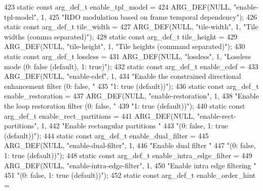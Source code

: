 \begin{DoxyCodeInclude}
{{{{{{{423 \textcolor{keyword}{static} \textcolor{keyword}{const} arg\_def\_t enable\_tpl\_model =
424     ARG\_DEF(NULL, \textcolor{stringliteral}{"enable-tpl-model"}, 1,
425             \textcolor{stringliteral}{"RDO modulation based on frame temporal dependency"});
426 \textcolor{keyword}{static} \textcolor{keyword}{const} arg\_def\_t tile\_width =
427     ARG\_DEF(NULL, \textcolor{stringliteral}{"tile-width"}, 1, \textcolor{stringliteral}{"Tile widths (comma separated)"});
428 \textcolor{keyword}{static} \textcolor{keyword}{const} arg\_def\_t tile\_height =
429     ARG\_DEF(NULL, \textcolor{stringliteral}{"tile-height"}, 1, \textcolor{stringliteral}{"Tile heights (command separated)"});
430 \textcolor{keyword}{static} \textcolor{keyword}{const} arg\_def\_t lossless =
431     ARG\_DEF(NULL, \textcolor{stringliteral}{"lossless"}, 1, \textcolor{stringliteral}{"Lossless mode (0: false (default), 1: true)"});
432 \textcolor{keyword}{static} \textcolor{keyword}{const} arg\_def\_t enable\_cdef =
433     ARG\_DEF(NULL, \textcolor{stringliteral}{"enable-cdef"}, 1,
434             \textcolor{stringliteral}{"Enable the constrained directional enhancement filter (0: false, "}
435             \textcolor{stringliteral}{"1: true (default))"});
436 \textcolor{keyword}{static} \textcolor{keyword}{const} arg\_def\_t enable\_restoration =
437     ARG\_DEF(NULL, \textcolor{stringliteral}{"enable-restoration"}, 1,
438             \textcolor{stringliteral}{"Enable the loop restoration filter (0: false, "}
439             \textcolor{stringliteral}{"1: true (default))"});
440 \textcolor{keyword}{static} \textcolor{keyword}{const} arg\_def\_t enable\_rect\_partitions =
441     ARG\_DEF(NULL, \textcolor{stringliteral}{"enable-rect-partitions"}, 1,
442             \textcolor{stringliteral}{"Enable rectangular partitions "}
443             \textcolor{stringliteral}{"(0: false, 1: true (default))"});
444 \textcolor{keyword}{static} \textcolor{keyword}{const} arg\_def\_t enable\_dual\_filter =
445     ARG\_DEF(NULL, \textcolor{stringliteral}{"enable-dual-filter"}, 1,
446             \textcolor{stringliteral}{"Enable dual filter "}
447             \textcolor{stringliteral}{"(0: false, 1: true (default))"});
448 \textcolor{keyword}{static} \textcolor{keyword}{const} arg\_def\_t enable\_intra\_edge\_filter =
449     ARG\_DEF(NULL, \textcolor{stringliteral}{"enable-intra-edge-filter"}, 1,
450             \textcolor{stringliteral}{"Enable intra edge filtering "}
451             \textcolor{stringliteral}{"(0: false, 1: true (default))"});
452 \textcolor{keyword}{static} \textcolor{keyword}{const} arg\_def\_t enable\_order\_hint =
}}}}}}}
\end{DoxyCodeInclude}
